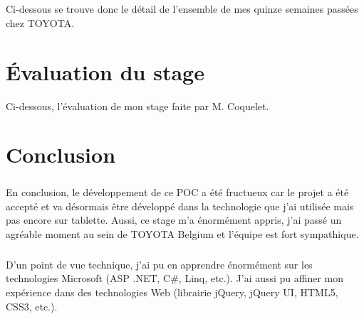 \documentclass[12pt]{report}
\begin{document}
\paragraph{}
Ci-dessous se trouve donc le détail de l'ensemble de mes quinze semaines passées chez TOYOTA.
















\chapter{Évaluation du stage}
Ci-dessous, l'évaluation de mon stage faite par M. Coquelet.

\chapter{Conclusion}
\paragraph{}
En conclusion, le développement de ce POC a été fructueux car le projet a été accepté et va désormais être développé dans la technologie que j'ai utilisée mais pas encore sur tablette.
Aussi, ce stage m'a énormément appris, j'ai passé un agréable moment au sein de TOYOTA Belgium et l'équipe est fort sympathique.
\paragraph{}
D'un point de vue technique, j'ai pu en apprendre énormément sur les technologies Microsoft (ASP .NET, C\#, Linq, etc.). J'ai aussi pu affiner mon expérience dans des technologies Web (librairie jQuery, jQuery UI, HTML5, CSS3, etc.).
\end{document}
